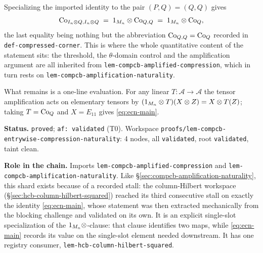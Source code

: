 Specializing the imported identity to the pair $(P,Q)=(Q,Q)$ gives
\[
  \mathrm{Co}_{I_{n}\otimes Q,I_{n}\otimes Q}\;=\;1_{M_{n}}\otimes\mathrm{Co}_{Q,Q}\;=\;1_{M_{n}}\otimes\mathrm{Co}_{Q},
\]
the last equality being nothing but the abbreviation $\mathrm{Co}_{Q,Q}=\mathrm{Co}_{Q}$ recorded in
\texttt{def-compressed-corner}. This is where the whole quantitative content of the
statement sits: the threshold, the $\theta$-domain control and the amplification
argument are all inherited from \texttt{lem-compcb-amplified-compression}, which in turn
rests on \texttt{lem-compcb-amplification-naturality}.

What remains is a one-line evaluation. For any linear $T:\mathcal A\to\mathcal A$ the
tensor amplification acts on elementary tensors by
$(1_{M_{n}}\otimes T)(X\otimes Z)=X\otimes T(Z)$; taking $T=\mathrm{Co}_{Q}$ and $X=E_{11}$ gives
\eqref{eq:ecn-main}.

\medskip
\noindent\textbf{Status.} \texttt{proved}; \texttt{af: validated} (T0). Workspace
\texttt{proofs/lem-compcb-entrywise-compression-naturality}: 4 nodes, all
\texttt{validated}, root \texttt{validated}, taint clean.

\noindent\textbf{Role in the chain.} Imports \texttt{lem-compcb-amplified-compression}
and \texttt{lem-compcb-amplification-naturality}. Like
\S\ref{sec:compcb-amplification-naturality}, this shard exists because of a recorded
stall: the column-Hilbert workspace (\S\ref{sec:hcb-column-hilbert-squared}) reached its
third consecutive stall on exactly the identity \eqref{eq:ecn-main}, whose statement was
then extracted mechanically from the blocking challenge and validated on its own. It is an explicit single-slot specialization of the $1_{M_{n}}\otimes$-clause: that clause identifies two maps, while \eqref{eq:ecn-main} records its value on the single-slot element needed downstream. It has one registry consumer,
\texttt{lem-hcb-column-hilbert-squared}.
